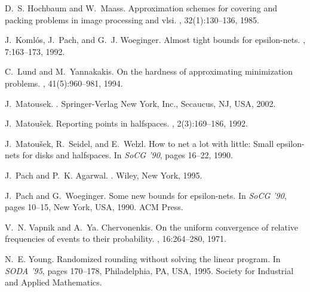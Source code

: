 \documentclass{stacs_proc}
\begin{document}
\begin{thebibliography}{10}
D.~S. Hochbaum and W.~Maass.
\newblock Approximation schemes for covering and packing problems in image
  processing and vlsi.
, 32(1):130--136, 1985.

J.~Koml\'{o}s, J.~Pach, and G.~J. Woeginger.
\newblock Almost tight bounds for epsilon-nets.
, 7:163--173, 1992.

C.~Lund and M.~Yannakakis.
\newblock On the hardness of approximating minimization problems.
, 41(5):960--981, 1994.

J.~Matousek.
.
\newblock Springer-Verlag New York, Inc., Secaucus, NJ, USA, 2002.

J.~Matou\v{s}ek.
\newblock Reporting points in halfspaces.
, 2(3):169--186, 1992.

J.~Matou\v{s}ek, R.~Seidel, and E.~Welzl.
\newblock How to net a lot with little: Small epsilon-nets for disks and
  halfspaces.
\newblock In {\em SoCG '90}, pages 16--22, 1990.

J.~Pach and P.~K. Agarwal.
.
\newblock Wiley, New York, 1995.

J.~Pach and G.~Woeginger.
\newblock Some new bounds for epsilon-nets.
\newblock In {\em SoCG '90}, pages 10--15, New York, USA, 1990. ACM Press.

V.~N. Vapnik and A.~Ya. Chervonenkis.
\newblock On the uniform convergence of relative frequencies of events to their
  probability.
, 16:264--280, 1971.

N.~E. Young.
\newblock Randomized rounding without solving the linear program.
\newblock In {\em SODA '95}, pages 170--178, Philadelphia, PA, USA, 1995.
  Society for Industrial and Applied Mathematics.

\end{thebibliography}
\end{document}
